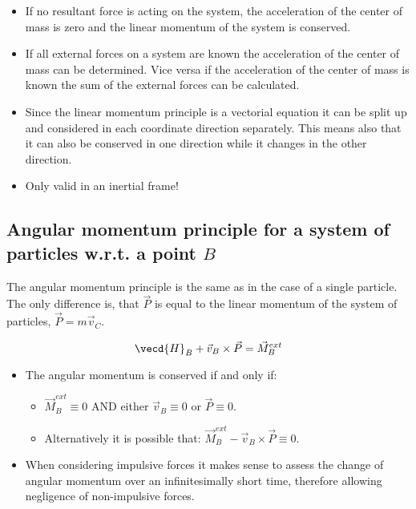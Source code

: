 \documentclass[10pt,a4paper]{scrartcl}
\begin{document}
\begin{multicols*}{2}
\begin{itemize}
\item If no resultant force is acting on the system, the acceleration of the center of mass is zero and the linear momentum of the system is conserved.
\item If all external forces on a system are known the acceleration of the center of mass can be determined. Vice versa if the acceleration of the center of mass is known the sum of the external forces can be calculated.
\item Since the linear momentum principle is a vectorial equation it can be split up and considered in each coordinate direction separately. This means also that it can also be conserved in one direction while it changes in the other direction.
\item Only valid in an inertial frame!
\end{itemize}

\subsection{Angular momentum principle for a system of particles w.r.t. a point $B$}

The angular momentum principle is the same as in the case of a single particle. The only difference is, that $\vec{P}$ is equal to the linear momentum of the system of particles, $\vec{P} = m \vec{v}_{C}.$

\begin{equation*}
\vecd{H}_B+\vec{v}_B\times\vec{P}=\vec{M}_B^{ext}
\end{equation*}



\begin{itemize}
\item The angular momentum is conserved if and only if:
\begin{itemize}
\item $\vec{M}_B^{ext}\equiv 0$ AND either $\vec{v}_B\equiv 0$ or $\vec{P}\equiv 0$.
\item Alternatively it is possible that: $\vec{M}_B^{ext}-\vec{v}_B\times\vec{P}\equiv 0$.
\end{itemize}
\item When considering impulsive forces it makes sense to assess the change of angular momentum over an infinitesimally short time, therefore allowing negligence of non-impulsive forces.
\end{itemize}


\end{multicols*}
\end{document}
